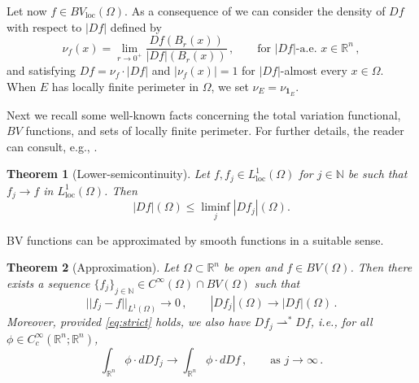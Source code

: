 \documentclass[a4paper,reqno,11pt]{amsart}
\newtheorem{theorem}{Theorem}[section]
\newcommand{\N}{\mathbb{N}}
\newcommand{\R}{\mathbb{R}}
\newcommand{\weakto}{\rightharpoonup}
\newcommand{\loc}{\mathop{\mathrm{loc}}}
\newcommand{\ch}{\mathbf{1}}
\begin{document}
Let now $f \in BV_{\loc}(\Omega)$. As a consequence of \cite[Corollary 5.11]{maggi2012sets} we can consider the density of $Df$ with respect to $|Df|$ defined by
	\begin{equation*}
		\nu_{f}(x) = \lim_{r \rightarrow 0^+} \dfrac{Df(B_{r}(x))}{|Df|(B_{r}(x))} \, , \qquad \text{for $|Df|$-a.e. } x \in \R^{n} \, ,
	\end{equation*}
and satisfying $Df = \nu_{f} \cdot |Df|$ and $|\nu_{f}(x)| = 1$ for $|Df|$-almost every $x \in \Omega$. When $E$ has locally finite perimeter in $\Omega$, we set $\nu_{E} = \nu_{\ch_{E}}$. 

Next we recall some well-known facts concerning the total variation functional, $BV$ functions, and sets of locally finite perimeter. For further details, the reader can consult, e.g., \cite{maggi2012sets,EvansGariepy2015,Giu84book}.
\begin{theorem}[Lower-semicontinuity] \label{thm:lscBV} 
Let $f,f_{j}\in L^1_{\loc}(\Omega)$ for $j\in \N$ be such that $f_{j}\to f$ in $L^1_{\loc}(\Omega)$. Then 
\[
|Df|(\Omega) \leq \liminf_{j} |Df_{j}|(\Omega).
\]
\end{theorem}
	
BV functions can be approximated by smooth functions in a suitable sense.
	\begin{theorem}[Approximation] \label{thm:AnzGiaq}
		Let $\Omega \subset \R^{n}$ be open and $f \in BV(\Omega)$. Then there exists a sequence $\{ f_{j} \}_{j \in \N} \in C^{\infty}(\Omega) \cap BV(\Omega)$ such that
		\begin{equation} \label{eq:strict}
			||f_{j} - f||_{L^{1}(\Omega)} \rightarrow 0 \, , \qquad |Df_{j}|(\Omega) \rightarrow |Df|(\Omega) \, .
		\end{equation}
		Moreover, provided \eqref{eq:strict} holds, we also have $Df_{j} \weakto^{\ast} Df$, i.e., for all $\phi \in C^{\infty}_{c}(\R^{n};\R^{n})$,
		\begin{equation*}
			\int_{\R^{n}} \phi \cdot d Df_{j} \rightarrow \int_{\R^{n}} \phi \cdot d Df \, , \qquad \text{as } j \rightarrow \infty \, .
		\end{equation*}
	\end{theorem}
\end{document}
